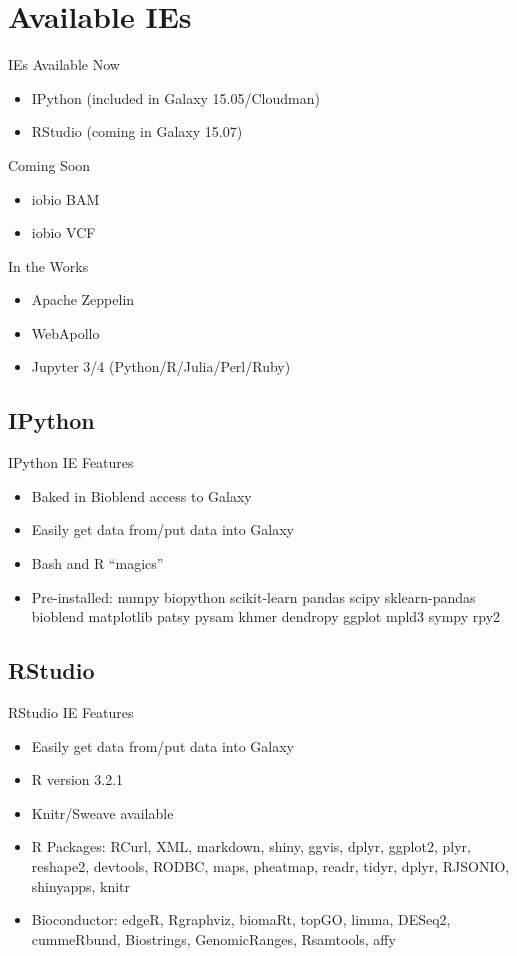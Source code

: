 \documentclass[12pt]{beamer} %
\begin{document}
\section{Available IEs}
\begin{frame}{IEs}
  Available Now
  \begin{itemize}
    \item IPython (included in Galaxy 15.05/Cloudman)
    \item RStudio (coming in Galaxy 15.07)
  \end{itemize}

  Coming Soon
  \begin{itemize}
    \item iobio BAM
    \item iobio VCF
  \end{itemize}
  
  In the Works
  \begin{itemize}
    \item Apache Zeppelin
    \item WebApollo
    \item Jupyter 3/4 (Python/R/Julia/Perl/Ruby)
  \end{itemize}
\end{frame}

\subsection{IPython}
\begin{frame}{IPython IE Features}
  \begin{itemize}
  	\item Baked in Bioblend access to Galaxy
  	\item Easily get data from/put data into Galaxy
    \item Bash and R ``magics''
    \item Pre-installed: numpy biopython scikit-learn pandas scipy sklearn-pandas bioblend matplotlib patsy pysam khmer dendropy ggplot mpld3 sympy rpy2
  \end{itemize}
\end{frame}

\subsection{RStudio}
\begin{frame}{RStudio IE Features}
  \begin{itemize}
  	\item Easily get data from/put data into Galaxy
    \item R version 3.2.1
    \item Knitr/Sweave available
    \item R Packages: RCurl, XML, markdown, shiny, ggvis, dplyr, ggplot2, plyr, reshape2, devtools, RODBC, maps, pheatmap, readr, tidyr, dplyr, RJSONIO, shinyapps, knitr
    \item Bioconductor: edgeR, Rgraphviz, biomaRt, topGO, limma, DESeq2, cummeRbund, Biostrings, GenomicRanges, Rsamtools, affy
  \end{itemize}
\end{frame}
\end{document}
